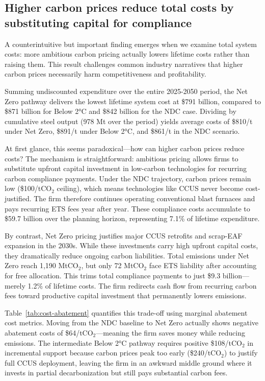 \subsection{Higher carbon prices reduce total costs by substituting capital for compliance}

A counterintuitive but important finding emerges when we examine total system costs: more ambitious carbon pricing actually lowers lifetime costs rather than raising them. This result challenges common industry narratives that higher carbon prices necessarily harm competitiveness and profitability.

Summing undiscounted expenditure over the entire 2025-2050 period, the Net Zero pathway delivers the lowest lifetime system cost at \$791 billion, compared to \$871 billion for Below 2°C and \$842 billion for the NDC case. Dividing by cumulative steel output (978 Mt over the period) yields average costs of \$810/t under Net Zero, \$891/t under Below 2°C, and \$861/t in the NDC scenario.

At first glance, this seems paradoxical—how can higher carbon prices reduce costs? The mechanism is straightforward: ambitious pricing allows firms to substitute upfront capital investment in low-carbon technologies for recurring carbon compliance payments. Under the NDC trajectory, carbon prices remain low (\$100/tCO$_2$ ceiling), which means technologies like CCUS never become cost-justified. The firm therefore continues operating conventional blast furnaces and pays recurring ETS fees year after year. These compliance costs accumulate to \$59.7 billion over the planning horizon, representing 7.1\% of lifetime expenditure.

By contrast, Net Zero pricing justifies major CCUS retrofits and scrap-EAF expansion in the 2030s. While these investments carry high upfront capital costs, they dramatically reduce ongoing carbon liabilities. Total emissions under Net Zero reach 1,190 MtCO$_2$, but only 72 MtCO$_2$ face ETS liability after accounting for free allocation. This trims total compliance payments to just \$9.3 billion—merely 1.2\% of lifetime costs. The firm redirects cash flow from recurring carbon fees toward productive capital investment that permanently lowers emissions.

Table~\ref{tab:cost-abatement} quantifies this trade-off using marginal abatement cost metrics. Moving from the NDC baseline to Net Zero actually shows negative abatement costs of \$64/tCO$_2$—meaning the firm saves money while reducing emissions. The intermediate Below 2°C pathway requires positive \$108/tCO$_2$ in incremental support because carbon prices peak too early (\$240/tCO$_2$) to justify full CCUS deployment, leaving the firm in an awkward middle ground where it invests in partial decarbonization but still pays substantial carbon fees.

